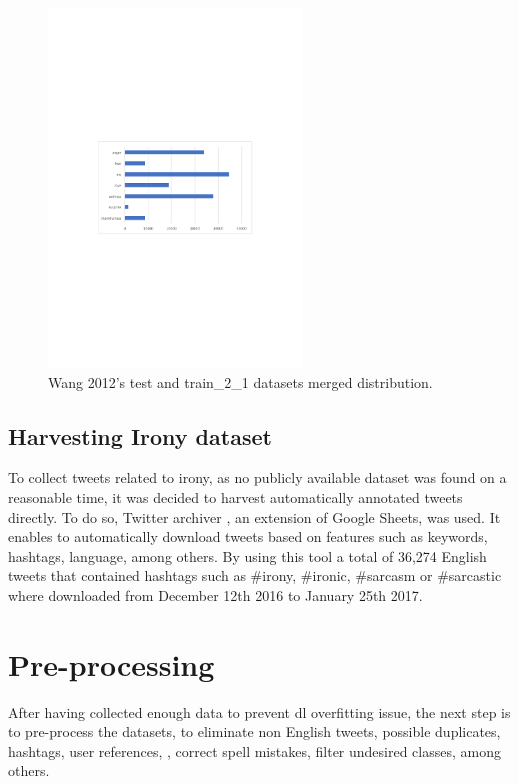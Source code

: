 \begin{figure}[!htp]
  \center
  \includegraphics[width=0.6\textwidth]{figures/wang_2012_dataset_distribution}
  \caption{Wang 2012's test and train\_2\_1 datasets merged distribution.}
  \label{fig:wang_2012_dataset_distribution}
\end{figure}

\subsection{Harvesting Irony dataset}

To collect tweets related to irony, as no publicly available dataset was found on a reasonable time, it was decided to harvest automatically annotated tweets directly. To do so, Twitter archiver \cite{twitterArchiver}, an extension of Google Sheets, was used. It enables to automatically download tweets based on features such as keywords, hashtags, language, among others. By using this tool a total of 36,274 English tweets that contained hashtags such as \#irony, \#ironic, \#sarcasm or \#sarcastic where downloaded from December 12th 2016 to January 25th 2017.

\section{Pre-processing}

After having collected enough data to prevent \acrshort{dl} overfitting issue, the next step is to pre-process the datasets, to eliminate non English tweets, possible duplicates, hashtags, user references, , correct spell mistakes, filter undesired classes, among others.

